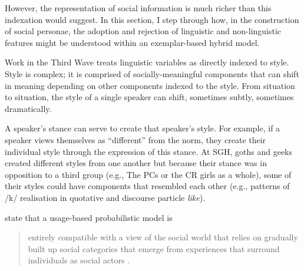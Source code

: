 However, the representation of social information is much richer than this indexation would suggest.  In this section, I step through how, in the construction of social personae, the adoption and rejection of linguistic and non-linguistic features might be understood within an exemplar-based hybrid model.

Work in the Third Wave treats linguistic variables as directly indexed to style.  Style is complex; it is comprised of socially-meaningful components that can shift in meaning depending on other components indexed to the style.  From situation to situation, the style of a single speaker can shift, sometimes subtly, sometimes dramatically.  

A speaker's stance can serve to create that speaker's style.  For example, if a speaker views themselves as ``different'' from the norm, they create their individual style through the expression of this stance.  At SGH, goths and geeks created different styles from one another but because their stance was in opposition to a third group (e.g., The PCs or the CR girls as a whole), some of their styles could have components that resembled each other (e.g., patterns of /k/ realisation in quotative and discourse particle \textit{like}).

 state that a usage-based probabilistic model is

\begin{quote}
entirely compatible with a view of the social world that relies on gradually built up social categories that emerge from experiences that surround individuals as social actors \cite[136]{mendozadentonetal2003}.
\end{quote}

